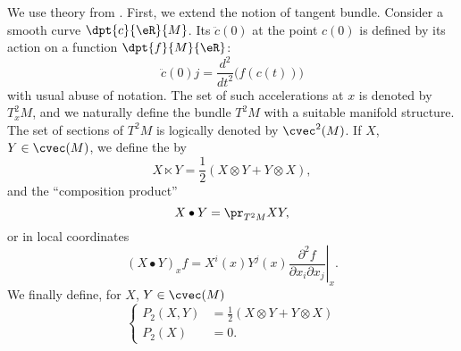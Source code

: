 We use theory from \cite{Loos}. First, we extend the notion of tangent bundle. Consider a smooth curve $\dpt{c}{\eR}{M}$. Its  $\ddot c(0)$ at the point $c(0)$ is defined by its action on a function $\dpt{f}{M}{\eR}$:
\begin{equation}
  \ddot c(0)j=\frac{d^2}{dt^2}\big( f(c(t))\big)
\end{equation}
with usual abuse of notation. The set of such accelerations at $x$ is denoted by $T^2_xM$, and we naturally define the bundle $T^2M$ with a suitable manifold structure. The set of sections of $T^2M$ is logically denoted by $\cvec^2(M)$. If $X$, $Y\in\cvec(M)$, we define the  by
\begin{equation}
X\ltimes Y=\frac{1}{2}(X\otimes Y+Y\otimes X),
\end{equation}
and the ``composition product''
\begin{equation}
  X\bullet Y=\pr_{T^2M} XY,
\end{equation}
or in local coordinates
\[
  (X\bullet Y)_x f= X^i(x)Y^j(x)\left.\frac{\partial^2f}{\partial x_i\partial x_j}\right|_x.
\]
We finally define, for $X$, $Y\in\cvec(M)$
\begin{equation}
\left\{
\begin{aligned}
  P_2(X,Y)&=\frac{1}{2}(X\otimes Y+Y\otimes X)\\
  P_2(X)&=0.
\end{aligned}
\right.
\end{equation}

